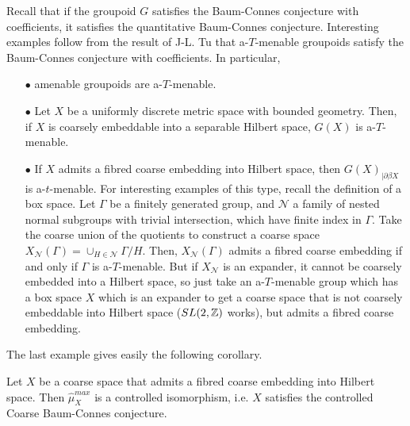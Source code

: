 Recall that if the groupoid $G$ satisfies the Baum-Connes conjecture with coefficients, it satisfies the quantitative Baum-Connes conjecture. Interesting examples follow from the result of J-L. Tu \cite{TuThese} that a-$T$-menable groupoids satisfy the Baum-Connes conjecture with coefficients. In particular, \\

\begin{itemize}
\item[$\bullet$] amenable groupoids are a-$T$-menable.\\
\item[$\bullet$] Let $X$ be a uniformly discrete metric space with bounded geometry. Then, if $X$ is coarsely embeddable into a separable Hilbert space, $G(X)$ is a-$T$-menable.\cite{SkTuYu} \\
\item[$\bullet$] If $X$ admits a fibred coarse embedding into Hilbert space, then $G(X)_{|\partial \beta X}$ is a-$t$-menable.\cite{FinnSellFibred} For interesting examples of this type, recall the definition of a box space. Let $\Gamma$ be a finitely generated group, and $\mathcal N$ a family of nested normal subgroups with trivial intersection, which have finite index in $\Gamma$. Take the coarse union of the quotients to construct a coarse space $X_{\mathcal N}(\Gamma)= \cup_{H\in \mathcal N } \Gamma/ H$. Then, $X_{\mathcal N}(\Gamma)$ admits a fibred coarse embedding if and only if $\Gamma$ is a-$T$-menable. But if $X_{\mathcal N}$ is an expander, it cannot be coarsely embedded into a Hilbert space, so just take an a-$T$-menable group which has a box space $X$ which is an expander to get a coarse space that is not coarsely embeddable into Hilbert space ($SL(2,\mathbb Z)$ works), but admits a fibred coarse embedding.\\
\end{itemize}

The last example gives easily the following corollary.

\begin{cor}
Let $X$ be a coarse space that admits a fibred coarse embedding into Hilbert space. Then $\hat \mu_{X}^{max}$ is a controlled isomorphism, i.e. $X$ satisfies the controlled Coarse Baum-Connes conjecture.
\end{cor}

